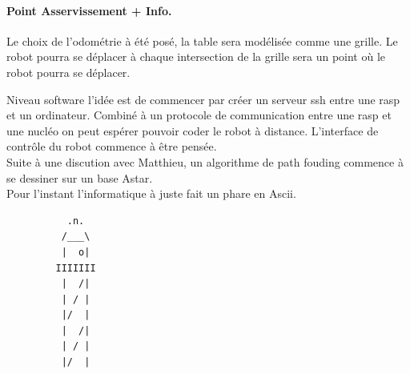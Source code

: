 \documentclass[a4paper,10pt]{report}
\begin{document}
\begin{spacing}{1.5}
\paragraph*{Point Asservissement + Info.}
Le choix de l'odométrie à été posé, la table sera modélisée comme une grille. Le
robot pourra se déplacer à chaque intersection de la grille sera un point où le
robot pourra se déplacer.\\
\begin{center}
\end{center}
Niveau software l'idée est de commencer par créer un serveur ssh entre une rasp
et un ordinateur. Combiné à un protocole de communication entre une rasp et une
nucléo on peut espérer pouvoir coder le robot à distance. L'interface de
contrôle du robot commence à être pensée. \\
Suite à une discution avec Matthieu, un algorithme de path fouding commence à se
dessiner sur un base Astar.\\ Pour l'instant l'informatique à juste fait un
phare en Ascii.
\newpage
\begin{figure}[!h]
  \center
  \begin{lstlisting}
     .n.
    /___\
    |  o|
   IIIIIII
    |  /|
    | / |
    |/  |
    |  /|
    | / |
    |/  |
  \end{lstlisting}
\end{figure}

\end{spacing}
\end{document}
